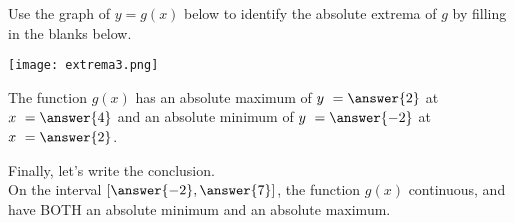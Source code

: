 \documentclass{ximera}
\begin{document}
\begin{exercise}
Use the graph of $y = g(x)$ below to identify the absolute extrema of $g$ by filling in the blanks below. 

\begin{center} \texttt{[image: extrema3.png]} \end{center}

The function $g(x)$ has an absolute maximum of $y \ = \answer{2}$ at $x \ = \answer{4}$ and an absolute minimum of $y \ = \answer{-2}$ at $x \ = \answer{2}$.

\begin{exercise}
Finally, let's write the conclusion.  \\

On the  interval $\left[ \answer{-2}, \answer{7}\right]$, the function $g(x)$  continuous, and  have BOTH an absolute minimum and an absolute maximum. 
\end{exercise}
\end{exercise}
\end{document}
